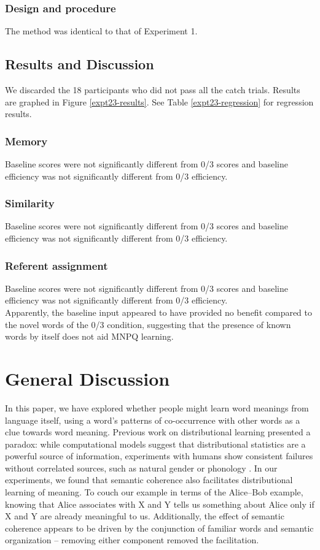 \documentclass[man,floatsintext]{apa6}
\begin{document}
\subsubsection{Design and procedure}
The method was identical to that of Experiment 1.

\subsection{Results and Discussion}
We discarded the 18 participants who did not pass all the catch trials. Results are graphed in Figure \ref{expt23-results}. See Table \ref{expt23-regression} for regression results.

\subsubsection{Memory}
Baseline scores were not significantly different from 0/3 scores and baseline efficiency was not significantly different from 0/3 efficiency.

\subsubsection{Similarity}
Baseline scores were not significantly different from 0/3 scores and baseline efficiency was not significantly different from 0/3 efficiency.

\subsubsection{Referent assignment}
Baseline scores were not significantly different from 0/3 scores and baseline efficiency was not significantly different from 0/3 efficiency.\\

Apparently, the baseline input appeared to have provided no benefit compared to the novel words of the 0/3 condition, suggesting that the presence of known words by itself does not aid MNPQ learning.

\section{General Discussion}

In this paper, we have explored whether people might learn word meanings from language itself, using a word's patterns of co-occurrence with other words as a clue towards word meaning. Previous work on distributional learning presented a paradox: while computational models suggest that distributional statistics are a powerful source of information, experiments with humans show consistent failures without correlated sources, such as natural gender \citep{braine1987} or phonology \citep{frigo1998, monaghan2005, lany2010}. In our experiments, we found that semantic coherence also facilitates distributional learning of meaning. To couch our example in terms of the Alice--Bob example, knowing that Alice associates with X and Y tells us something about Alice only if X and Y are already meaningful to us. Additionally, the effect of semantic coherence appears to be driven by the conjunction of familiar words and semantic organization -- removing either component removed the facilitation.
\end{document}
